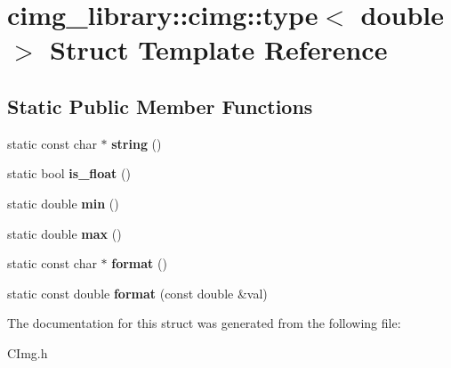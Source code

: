 \hypertarget{structcimg__library_1_1cimg_1_1type_3_01double_01_4}{\section{cimg\-\_\-library\-:\-:cimg\-:\-:type$<$ double $>$ Struct Template Reference}
\label{structcimg__library_1_1cimg_1_1type_3_01double_01_4}
}
\subsection*{Static Public Member Functions}
\begin{DoxyCompactItemize}
\item 
\hypertarget{structcimg__library_1_1cimg_1_1type_3_01double_01_4_a8974c6c26e1fee2c66c00f7951e72a01}{static const char $\ast$ {\bfseries string} ()}\label{structcimg__library_1_1cimg_1_1type_3_01double_01_4_a8974c6c26e1fee2c66c00f7951e72a01}

\item 
\hypertarget{structcimg__library_1_1cimg_1_1type_3_01double_01_4_a95b4f65e708f0da19767b31a42d11221}{static bool {\bfseries is\-\_\-float} ()}\label{structcimg__library_1_1cimg_1_1type_3_01double_01_4_a95b4f65e708f0da19767b31a42d11221}

\item 
\hypertarget{structcimg__library_1_1cimg_1_1type_3_01double_01_4_a44c8609817f59e8705504bf061849ac5}{static double {\bfseries min} ()}\label{structcimg__library_1_1cimg_1_1type_3_01double_01_4_a44c8609817f59e8705504bf061849ac5}

\item 
\hypertarget{structcimg__library_1_1cimg_1_1type_3_01double_01_4_ad651f1f463b89c934f79a6844986ac12}{static double {\bfseries max} ()}\label{structcimg__library_1_1cimg_1_1type_3_01double_01_4_ad651f1f463b89c934f79a6844986ac12}

\item 
\hypertarget{structcimg__library_1_1cimg_1_1type_3_01double_01_4_a9ba2402c7407bc0c86e6d4e8393b020d}{static const char $\ast$ {\bfseries format} ()}\label{structcimg__library_1_1cimg_1_1type_3_01double_01_4_a9ba2402c7407bc0c86e6d4e8393b020d}

\item 
\hypertarget{structcimg__library_1_1cimg_1_1type_3_01double_01_4_a480d9e6c0eb97c7d1b5a557cd70b1b12}{static const double {\bfseries format} (const double \&val)}\label{structcimg__library_1_1cimg_1_1type_3_01double_01_4_a480d9e6c0eb97c7d1b5a557cd70b1b12}

\end{DoxyCompactItemize}


The documentation for this struct was generated from the following file\-:\begin{DoxyCompactItemize}
\item 
C\-Img.\-h\end{DoxyCompactItemize}
